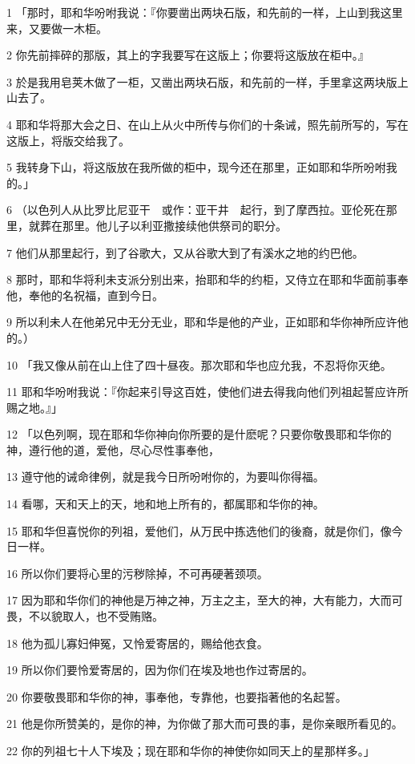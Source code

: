 \par 1 「那时，耶和华吩咐我说：『你要凿出两块石版，和先前的一样，上山到我这里来，又要做一木柜。
\par 2 你先前摔碎的那版，其上的字我要写在这版上；你要将这版放在柜中。』
\par 3 於是我用皂荚木做了一柜，又凿出两块石版，和先前的一样，手里拿这两块版上山去了。
\par 4 耶和华将那大会之日、在山上从火中所传与你们的十条诫，照先前所写的，写在这版上，将版交给我了。
\par 5 我转身下山，将这版放在我所做的柜中，现今还在那里，正如耶和华所吩咐我的。」
\par 6 （以色列人从比罗比尼亚干　或作：亚干井　起行，到了摩西拉。亚伦死在那里，就葬在那里。他儿子以利亚撒接续他供祭司的职分。
\par 7 他们从那里起行，到了谷歌大，又从谷歌大到了有溪水之地的约巴他。
\par 8 那时，耶和华将利未支派分别出来，抬耶和华的约柜，又侍立在耶和华面前事奉他，奉他的名祝福，直到今日。
\par 9 所以利未人在他弟兄中无分无业，耶和华是他的产业，正如耶和华你神所应许他的。）
\par 10 「我又像从前在山上住了四十昼夜。那次耶和华也应允我，不忍将你灭绝。
\par 11 耶和华吩咐我说：『你起来引导这百姓，使他们进去得我向他们列祖起誓应许所赐之地。』」
\par 12 「以色列啊，现在耶和华你神向你所要的是什麽呢？只要你敬畏耶和华你的神，遵行他的道，爱他，尽心尽性事奉他，
\par 13 遵守他的诫命律例，就是我今日所吩咐你的，为要叫你得福。
\par 14 看哪，天和天上的天，地和地上所有的，都属耶和华你的神。
\par 15 耶和华但喜悦你的列祖，爱他们，从万民中拣选他们的後裔，就是你们，像今日一样。
\par 16 所以你们要将心里的污秽除掉，不可再硬著颈项。
\par 17 因为耶和华你们的神他是万神之神，万主之主，至大的神，大有能力，大而可畏，不以貌取人，也不受贿赂。
\par 18 他为孤儿寡妇伸冤，又怜爱寄居的，赐给他衣食。
\par 19 所以你们要怜爱寄居的，因为你们在埃及地也作过寄居的。
\par 20 你要敬畏耶和华你的神，事奉他，专靠他，也要指著他的名起誓。
\par 21 他是你所赞美的，是你的神，为你做了那大而可畏的事，是你亲眼所看见的。
\par 22 你的列祖七十人下埃及；现在耶和华你的神使你如同天上的星那样多。」

